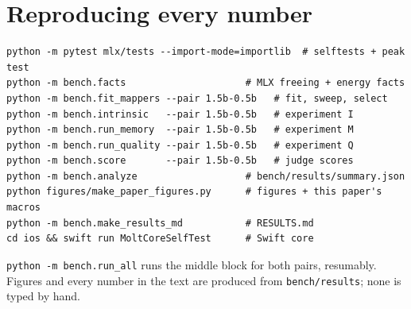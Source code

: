 \section{Reproducing every number}\label{app:repro}
{\small\begin{verbatim}
python -m pytest mlx/tests --import-mode=importlib  # selftests + peak test
python -m bench.facts                     # MLX freeing + energy facts
python -m bench.fit_mappers --pair 1.5b-0.5b   # fit, sweep, select
python -m bench.intrinsic   --pair 1.5b-0.5b   # experiment I
python -m bench.run_memory  --pair 1.5b-0.5b   # experiment M
python -m bench.run_quality --pair 1.5b-0.5b   # experiment Q
python -m bench.score       --pair 1.5b-0.5b   # judge scores
python -m bench.analyze                   # bench/results/summary.json
python figures/make_paper_figures.py      # figures + this paper's macros
python -m bench.make_results_md           # RESULTS.md
cd ios && swift run MoltCoreSelfTest      # Swift core
\end{verbatim}}
\noindent \texttt{python -m bench.run\_all} runs the middle block for both pairs, resumably.
Figures and every number in the text are produced from \texttt{bench/results}; none is typed by hand.
